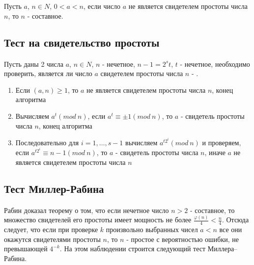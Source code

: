   \begin{statement}   
  
      Пусть {$a$}, {$n \in N$}, {$0 < a < n$}, если число {$a$} не является свидетелем 
    простоты числа {$n$}, то {$n$} - составное.
    
  \end{statement}

\subsection{Тест на свидетельство простоты}

\paragraph{} Пусть даны 2 числа {$a$}, {$n \in N$}, {$n$} - нечетное, {$n - 1 = 2^{s} t$}, 
{$t$} - нечетное, необходимо проверить, является ли число {$a$} свидетелем простоты числа {$n$} - \cite[Глава 5, страницы 169-170]{mah06}.

  \begin{enumerate}
   \item Если {$(a, n) \ge 1$}, то {$a$} не является свидетелем простоты числа {$n$}, конец алгоритма
   \item Вычисляем {$a^{ t} (mod \: n)$}, если {$a^{ t} \equiv \pm 1(mod \: n)$}, то {$a$}
    - свидетель простоты числа {$n$}, конец алгоритма
   \item Последовательно для {$i=1, \dots, s - 1$} вычисляем {$a^{ t 2^{ i}}(mod \: n)$} и 
    проверяем, если {$a^{ t 2^{ i}} \equiv n - 1 (mod \: n)$}, то {$a$} - 
    свидетель простоты числа {$n$}, иначе {$a$} не является свидетелем простоты числа {$n$}
  \end{enumerate}

  
\subsection{Тест Миллер-Рабина}

\paragraph{} Рабин доказал теорему о том, что если нечетное число $n > 2$ - составное, то множество свидетелей его простоты имеет мощность не более
$\frac{\varphi(n)}{4} < \frac{n}{4}$. Отсюда следует, что если при проверке $k$ произвольно выбранных чисел $a < n$ все они окажутся свидетелями простоты $n$, то $n$ -
простое с вероятностью ошибки, не превышающей $4^{ -k}$. На этом наблюдении строится следующий тест Миллера–Рабина.


